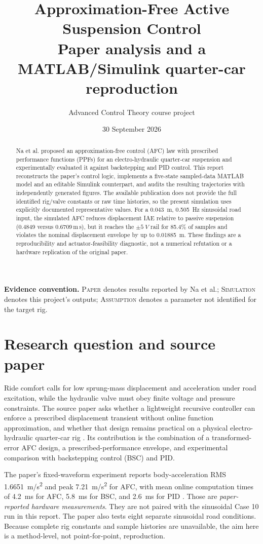\documentclass[10pt,a4paper]{article}
\title{\textbf{Approximation-Free Active Suspension Control}\large\\[0.25em]
Paper analysis and a MATLAB/Simulink quarter-car reproduction}
\author{Advanced Control Theory course project}
\date{30 September 2026}
\begin{document}
\maketitle
\vspace{-1.5em}

\begin{abstract}
Na et al. proposed an approximation-free control (AFC) law with prescribed performance functions (PPFs) for an electro-hydraulic quarter-car suspension and experimentally evaluated it against backstepping and PID control. This report reconstructs the paper's control logic, implements a five-state sampled-data MATLAB model and an editable Simulink counterpart, and audits the resulting trajectories with independently generated figures. The available publication does not provide the full identified rig/valve constants or raw time histories, so the present simulation uses explicitly documented representative values. For a \SI{0.043}{m}, \SI{0.505}{Hz} sinusoidal road input, the simulated AFC reduces displacement IAE relative to passive suspension (0.4849 versus 0.6709\,m\,s), but it reaches the \(\pm\SI{5}{V}\) rail for 85.4\% of samples and violates the nominal displacement envelope by up to \SI{0.01885}{m}. These findings are a reproducibility and actuator-feasibility diagnostic, not a numerical refutation or a hardware replication of the original paper.
\end{abstract}

\noindent\textbf{Evidence convention.} \textsc{Paper} denotes results reported by Na et al.; \textsc{Simulation} denotes this project's outputs; \textsc{Assumption} denotes a parameter not identified for the target rig.

\section{Research question and source paper}
Ride comfort calls for low sprung-mass displacement and acceleration under road excitation, while the hydraulic valve must obey finite voltage and pressure constraints. The source paper asks whether a lightweight recursive controller can enforce a prescribed displacement transient without online function approximation, and whether that design remains practical on a physical electro-hydraulic quarter-car rig \cite{na2022}. Its contribution is the combination of a transformed-error AFC design, a prescribed-performance envelope, and experimental comparison with backstepping control (BSC) and PID.

The paper's fixed-waveform experiment reports body-acceleration RMS \SI{1.6651}{m/s^2} and peak \SI{7.21}{m/s^2} for AFC, with mean online computation times of \SI{4.2}{ms} for AFC, \SI{5.8}{ms} for BSC, and \SI{2.6}{ms} for PID \cite{na2022}. Those are \emph{paper-reported hardware measurements}. They are not paired with the sinusoidal Case 10 run in this report. The paper also tests eight separate sinusoidal road conditions. Because complete rig constants and sample histories are unavailable, the aim here is a method-level, not point-for-point, reproduction.
\end{document}
